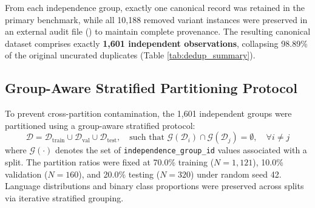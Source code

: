 \documentclass[11pt,a4paper]{article}
\begin{document}
From each independence group, exactly one canonical record was retained in the primary benchmark, while all 10,188 removed variant instances were preserved in an external audit file () to maintain complete provenance. The resulting canonical dataset comprises exactly \textbf{1,601 independent observations}, collapsing 98.89\% of the original uncurated duplicates (Table \ref{tab:dedup_summary}).

\begin{table}[t]
\centering
\small
\caption{\textbf{Quantitative summary of dataset deconstruction and deduplication stages.}}
\label{tab:dedup_summary}
\end{table}

\subsection{Group-Aware Stratified Partitioning Protocol}
To prevent cross-partition contamination, the 1,601 independent groups were partitioned using a group-aware stratified protocol:
\begin{equation}
    \mathcal{D} = \mathcal{D}_{\text{train}} \cup \mathcal{D}_{\text{val}} \cup \mathcal{D}_{\text{test}}, \quad \text{such that } \mathcal{G}(\mathcal{D}_i) \cap \mathcal{G}(\mathcal{D}_j) = \emptyset, \quad \forall i \neq j
\end{equation}
where $\mathcal{G}(\cdot)$ denotes the set of \texttt{independence\_group\_id} values associated with a split. The partition ratios were fixed at 70.0\% training ($N = 1,121$), 10.0\% validation ($N = 160$), and 20.0\% testing ($N = 320$) under random seed 42. Language distributions and binary class proportions were preserved across splits via iterative stratified grouping.
\end{document}
